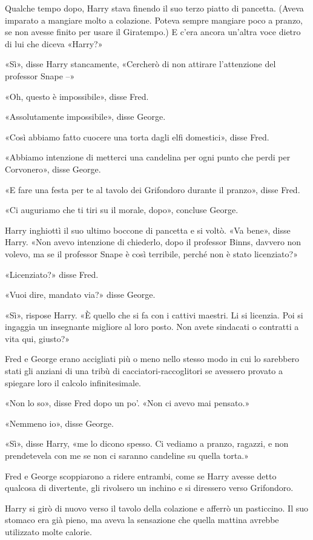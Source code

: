 Qualche tempo dopo, Harry stava finendo il suo terzo piatto di pancetta. (Aveva imparato a mangiare molto a colazione. Poteva sempre mangiare poco a pranzo, se non avesse finito per usare il Giratempo.) E c’era ancora un’altra voce dietro di lui che diceva «Harry?»

«Sì», disse Harry stancamente, «Cercherò di non attirare l’attenzione del professor Snape –»

«Oh, questo è impossibile», disse Fred.

«Assolutamente impossibile», disse George.

«Così abbiamo fatto cuocere una torta dagli elfi domestici», disse Fred.

«Abbiamo intenzione di metterci una candelina per ogni punto che perdi per Corvonero», disse George.

«E fare una festa per te al tavolo dei Grifondoro durante il pranzo», disse Fred.

«Ci auguriamo che ti tiri su il morale, dopo», concluse George.

Harry inghiottì il suo ultimo boccone di pancetta e si voltò. «Va bene», disse Harry. «Non avevo intenzione di chiederlo, dopo il professor Binns, davvero non volevo, ma se il professor Snape è così terribile, perché non è stato licenziato?»

«Licenziato?» disse Fred.

«Vuoi dire, mandato via?» disse George.

«Sì», rispose Harry. «È quello che si fa con i cattivi maestri. Li si licenzia. Poi si ingaggia un insegnante migliore al loro posto. Non avete sindacati o contratti a vita qui, giusto?»

Fred e George erano accigliati più o meno nello stesso modo in cui lo sarebbero stati gli anziani di una tribù di cacciatori-raccoglitori se avessero provato a spiegare loro il calcolo infinitesimale.

«Non lo so», disse Fred dopo un po’. «Non ci avevo mai pensato.»

«Nemmeno io», disse George.

«Sì», disse Harry, «me lo dicono spesso. Ci vediamo a pranzo, ragazzi, e non prendetevela con me se non ci saranno candeline su quella torta.»

Fred e George scoppiarono a ridere entrambi, come se Harry avesse detto qualcosa di divertente, gli rivolsero un inchino e si diressero verso Grifondoro.

Harry si girò di nuovo verso il tavolo della colazione e afferrò un pasticcino. Il suo stomaco era già pieno, ma aveva la sensazione che quella mattina avrebbe utilizzato molte calorie.

